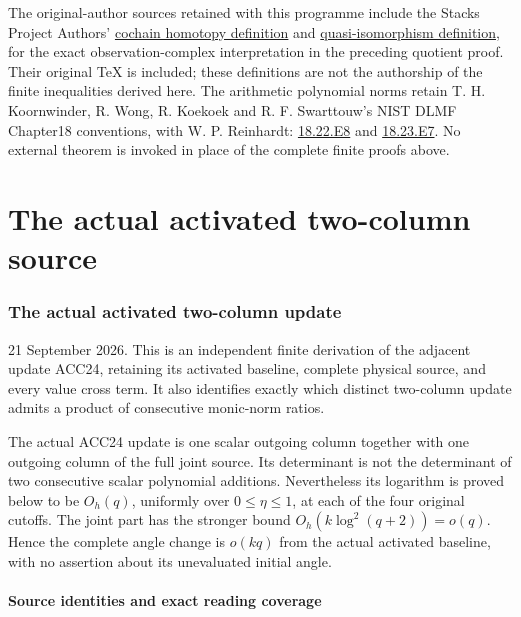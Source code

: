 \documentclass[11pt]{article}
\begin{document}
The original-author sources retained with this programme include the Stacks Project Authors' \href{https://github.com/stacks/stacks-project/blob/a04446e57ec1fbc252a871afcec7752fb2807b14/homology.tex\#L3057}{cochain homotopy definition} and \href{https://github.com/stacks/stacks-project/blob/a04446e57ec1fbc252a871afcec7752fb2807b14/homology.tex\#L3160}{quasi-isomorphism definition}, for the exact observation-complex interpretation in the preceding quotient proof. Their original TeX is included; these definitions are not the authorship of the finite inequalities derived here. The arithmetic polynomial norms retain T. H. Koornwinder, R. Wong, R. Koekoek and R. F. Swarttouw's NIST DLMF Chapter18 conventions, with W. P. Reinhardt: \href{https://dlmf.nist.gov/18.22.E8}{18.22.E8} and \href{https://dlmf.nist.gov/18.23.E7}{18.23.E7}. No external theorem is invoked in place of the complete finite proofs above.

\clearpage\part{The actual activated two-column source}
\section{The actual activated two-column update}\label{the-actual-activated-two-column-update}

21 September 2026. This is an independent finite derivation of the adjacent update ACC24, retaining its activated baseline, complete physical source, and every value cross term. It also identifies exactly which distinct two-column update admits a product of consecutive monic-norm ratios.

The actual ACC24 update is one scalar outgoing column together with one outgoing column of the full joint source. Its determinant is not the determinant of two consecutive scalar polynomial additions. Nevertheless its logarithm is proved below to be \(O_h(q)\), uniformly over \(0\le\eta\le1\), at each of the four original cutoffs. The joint part has the stronger bound \(O_h(k\log^2(q+2))=o(q)\). Hence the complete angle change is \(o(kq)\) from the actual activated baseline, with no assertion about its unevaluated initial angle.

\subsection{Source identities and exact reading coverage}\label{source-identities-and-exact-reading-coverage}
\end{document}
